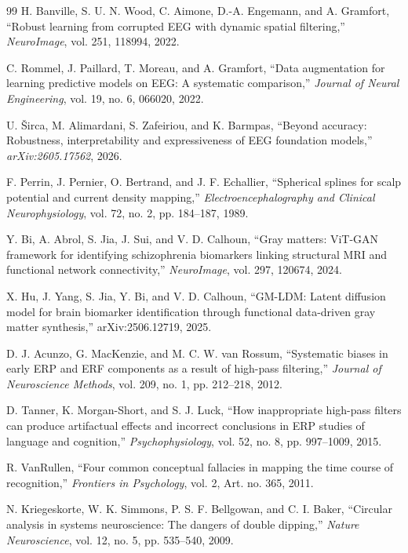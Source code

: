 \documentclass[journal]{IEEEtran}
\begin{document}
\begin{thebibliography}{99}
H. Banville, S. U. N. Wood, C. Aimone, D.-A. Engemann, and A. Gramfort, ``Robust learning from corrupted EEG with dynamic spatial filtering,'' \emph{NeuroImage}, vol. 251, 118994, 2022.

C. Rommel, J. Paillard, T. Moreau, and A. Gramfort, ``Data augmentation for learning predictive models on EEG: A systematic comparison,'' \emph{Journal of Neural Engineering}, vol. 19, no. 6, 066020, 2022.

U. \v{S}irca, M. Alimardani, S. Zafeiriou, and K. Barmpas, ``Beyond accuracy: Robustness, interpretability and expressiveness of EEG foundation models,'' \emph{arXiv:2605.17562}, 2026.

F. Perrin, J. Pernier, O. Bertrand, and J. F. Echallier, ``Spherical splines for scalp potential and current density mapping,'' \emph{Electroencephalography and Clinical Neurophysiology}, vol. 72, no. 2, pp. 184--187, 1989.

Y. Bi, A. Abrol, S. Jia, J. Sui, and V. D. Calhoun, ``Gray matters: ViT-GAN framework for identifying schizophrenia biomarkers linking structural MRI and functional network connectivity,'' \emph{NeuroImage}, vol. 297, 120674, 2024.

X. Hu, J. Yang, S. Jia, Y. Bi, and V. D. Calhoun, ``GM-LDM: Latent diffusion model for brain biomarker identification through functional data-driven gray matter synthesis,'' arXiv:2506.12719, 2025.

D. J. Acunzo, G. MacKenzie, and M. C. W. van Rossum, ``Systematic biases in early ERP and ERF components as a result of high-pass filtering,'' \emph{Journal of Neuroscience Methods}, vol. 209, no. 1, pp. 212--218, 2012.

D. Tanner, K. Morgan-Short, and S. J. Luck, ``How inappropriate high-pass filters can produce artifactual effects and incorrect conclusions in ERP studies of language and cognition,'' \emph{Psychophysiology}, vol. 52, no. 8, pp. 997--1009, 2015.

R. VanRullen, ``Four common conceptual fallacies in mapping the time course of recognition,'' \emph{Frontiers in Psychology}, vol. 2, Art. no. 365, 2011.

N. Kriegeskorte, W. K. Simmons, P. S. F. Bellgowan, and C. I. Baker, ``Circular analysis in systems neuroscience: The dangers of double dipping,'' \emph{Nature Neuroscience}, vol. 12, no. 5, pp. 535--540, 2009.


\end{thebibliography}
\end{document}
